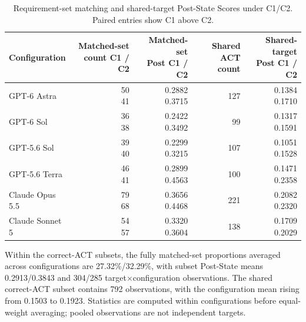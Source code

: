 \documentclass{article} %
\begin{document}
\begin{table}[htbp]
\caption{Requirement-set matching and shared-target Post-State Scores under C1/C2. Paired entries show C1 above C2.}
\label{tab:matched-state-diagnostics}
\centering\normalsize
\setlength{\tabcolsep}{3pt}
\renewcommand{\arraystretch}{1.08}
\begin{tabular}{@{}lrrrr@{}}
\toprule
Configuration & \shortstack[c]{Matched-set\\count C1 / C2} & \shortstack[c]{Matched-set\\Post C1 / C2} & \shortstack[c]{Shared ACT\\count} & \shortstack[c]{Shared-target\\Post C1 / C2} \\
\midrule
GPT-6 Astra & \shortstack[r]{50\\41} & \shortstack[r]{0.2882\\0.3715} & 127 & \shortstack[r]{0.1384\\0.1710} \\
GPT-6 Sol & \shortstack[r]{36\\38} & \shortstack[r]{0.2422\\0.3492} & 99 & \shortstack[r]{0.1317\\0.1591} \\
GPT-5.6 Sol & \shortstack[r]{39\\40} & \shortstack[r]{0.2299\\0.3215} & 107 & \shortstack[r]{0.1051\\0.1528} \\
GPT-5.6 Terra & \shortstack[r]{46\\41} & \shortstack[r]{0.2899\\0.4563} & 100 & \shortstack[r]{0.1471\\0.2358} \\
Claude Opus 5.5 & \shortstack[r]{79\\68} & \shortstack[r]{0.3656\\0.4468} & 221 & \shortstack[r]{0.2082\\0.2320} \\
Claude Sonnet 5 & \shortstack[r]{54\\57} & \shortstack[r]{0.3320\\0.3604} & 138 & \shortstack[r]{0.1709\\0.2029} \\
\bottomrule
\end{tabular}
\end{table}

Within the correct-ACT subsets, the fully matched-set proportions averaged across configurations are 27.32\%/32.29\%, with subset Post-State means 0.2913/0.3843 and 304/285 target\(\times\)configuration observations. The shared correct-ACT subset contains 792 observations, with the configuration mean rising from 0.1503 to 0.1923. Statistics are computed within configurations before equal-weight averaging; pooled observations are not independent targets.
\end{document}

